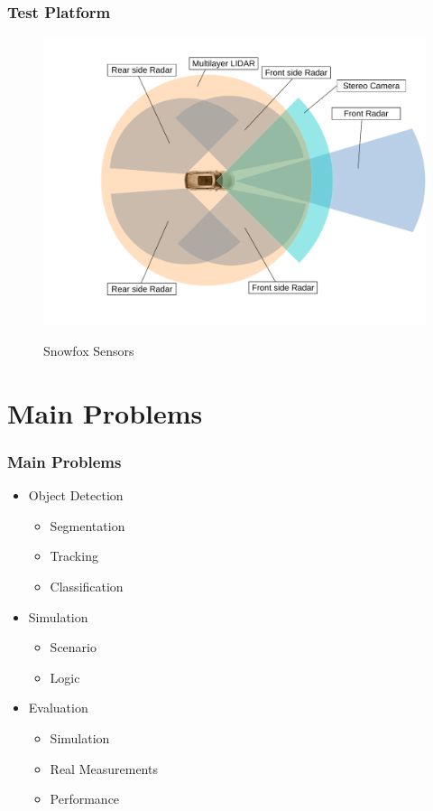 \documentclass[nosymbols]{beamer}	%
\begin{document}
\begin{frame}
\frametitle{Test Platform}
\begin{figure}[!ht]
\caption{Snowfox Sensors}
\includegraphics[width=\textwidth,height=0.7\textheight,keepaspectratio]{sensors.pdf}
\label{platform}
\end{figure}
\end{frame}






\section{Main Problems}
%
\begin{frame}
	\frametitle{Main Problems}
	\begin{itemize}
		\item Object Detection
		\begin{itemize}
			\item Segmentation
			\item Tracking
			\item Classification
		\end{itemize}
		\item Simulation
		\begin{itemize}
			\item Scenario
			\item Logic
		\end{itemize}
		\item Evaluation
		\begin{itemize}
			\item Simulation
			\item Real Measurements
			\item Performance
		\end{itemize}
	\end{itemize}
\end{frame}
\end{document}
